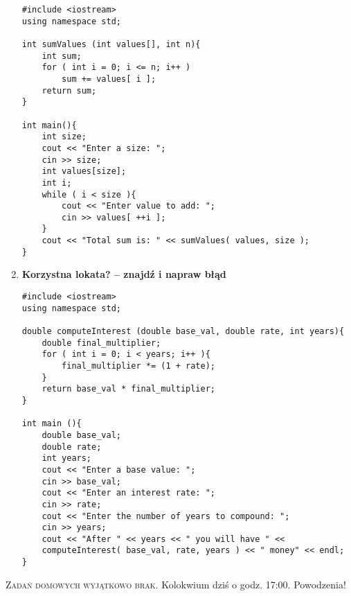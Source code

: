 \documentclass[12pt]{article}
\begin{document}
\begin{enumerate}
\begin{Verbatim}[fontsize=\tiny]
#include <iostream>
using namespace std;

int sumValues (int values[], int n){
	int sum;
	for ( int i = 0; i <= n; i++ )
		sum += values[ i ];
	return sum;
}

int main(){
	int size;
	cout << "Enter a size: ";
	cin >> size;
	int values[size];
	int i;
	while ( i < size ){
		cout << "Enter value to add: ";
		cin >> values[ ++i ];
	}
	cout << "Total sum is: " << sumValues( values, size );
} 
\end{Verbatim}

\item \textbf{Korzystna lokata?  -- znajdź i napraw błąd}\\

\begin{Verbatim}[fontsize=\tiny]
#include <iostream>
using namespace std;

double computeInterest (double base_val, double rate, int years){
	double final_multiplier;
	for ( int i = 0; i < years; i++ ){
		final_multiplier *= (1 + rate);
	}
	return base_val * final_multiplier;
}

int main (){
	double base_val;
	double rate;
	int years;
	cout << "Enter a base value: ";
	cin >> base_val;
	cout << "Enter an interest rate: ";
	cin >> rate;
	cout << "Enter the number of years to compound: ";
	cin >> years;
	cout << "After " << years << " you will have " << 
	computeInterest( base_val, rate, years ) << " money" << endl;
} 
\end{Verbatim}

\end{enumerate}

\vspace{0.3cm}
\small \textsc{Zadań domowych wyjątkowo brak.} Kolokwium dziś o godz. 17:00. Powodzenia!
\end{document}
